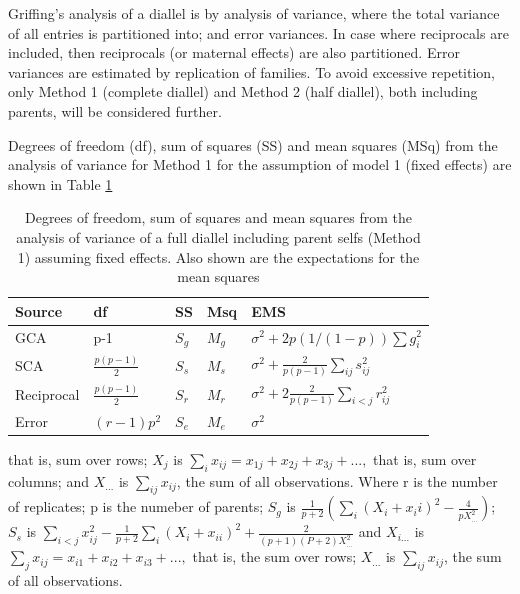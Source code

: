 \documentclass[11pt,dvipsnames,ignorenonframetext,aspectratio=169]{beamer}
\begin{document}
\begin{frame}{}
\protect\hypertarget{section-13}{}
Griffing's analysis of a diallel is by analysis of variance, where the
total variance of all entries is partitioned into; and error variances.
In case where reciprocals are included, then reciprocals (or maternal
effects) are also partitioned. Error variances are estimated by
replication of families. To avoid excessive repetition, only Method 1
(complete diallel) and Method 2 (half diallel), both including parents,
will be considered further.
\end{frame}

\begin{frame}{}
\protect\hypertarget{section-14}{}
\footnotesize

Degrees of freedom (df), sum of squares (SS) and mean squares (MSq) from
the analysis of variance for Method 1 for the assumption of model 1
(fixed effects) are shown in Table \ref{tab:complete-diallel-fixed}

\begin{table}

\caption{\label{tab:complete-diallel-fixed}Degrees of freedom, sum of squares and mean squares from the analysis of variance of a full diallel including parent selfs (Method 1) assuming fixed effects. Also shown are the expectations for the mean squares}
\centering
\fontsize{8}{10}\selectfont
\begin{tabular}[t]{lllll}
\toprule
Source & df & SS & Msq & EMS\\
\midrule
GCA & p-1 & $S_g$ & $M_g$ & $\sigma^2 + 2p(1/(1-p))\sum g^2_i$\\
SCA & $\frac{p(p-1)}{2}$ & $S_s$ & $M_s$ & $\sigma^2 + \frac{2}{p(p-1)}\sum_{ij}s_{ij}^2$\\
Reciprocal & $\frac{p(p-1)}{2}$ & $S_r$ & $M_r$ & $\sigma^2 + 2\frac{2}{p(p-1)}\sum_{i<j}r_{ij}^2$\\
Error & $(r-1)p^2$ & $S_e$ & $M_e$ & $\sigma^2$\\
\bottomrule
\end{tabular}
\end{table}

that is, sum over rows; \(X_j\) is
\(\sum_ix_{ij} = x_{1j} + x_{2j} + x_{3j} + ...,\) that is, sum over
columns; and \(X_{...}\) is \(\sum_{ij}x_{ij}\), the sum of all
observations. Where r is the number of replicates; p is the numeber of
parents; \(S_g\) is
\(\frac{1}{p+2}(\sum_i(X_i + x_ii)^2-\frac{4}{pX_{...}^2})\); \(S_s\) is
\(\sum_{i<j}x_{ij}^2-\frac{1}{p+2}\sum_i(X_i + x_{ii})^2 + \frac{2}{(p+1)(P+2)X_{...}^2}\)
and \(X_{i...}\) is \(\sum_j x_{ij} = x_{i1} + x_{i2} + x_{i3} + ...,\)
that is, the sum over rows; \(X_{...}\) is \(\sum_{ij}x_{ij}\), the sum
of all observations.
\end{frame}
\end{document}
